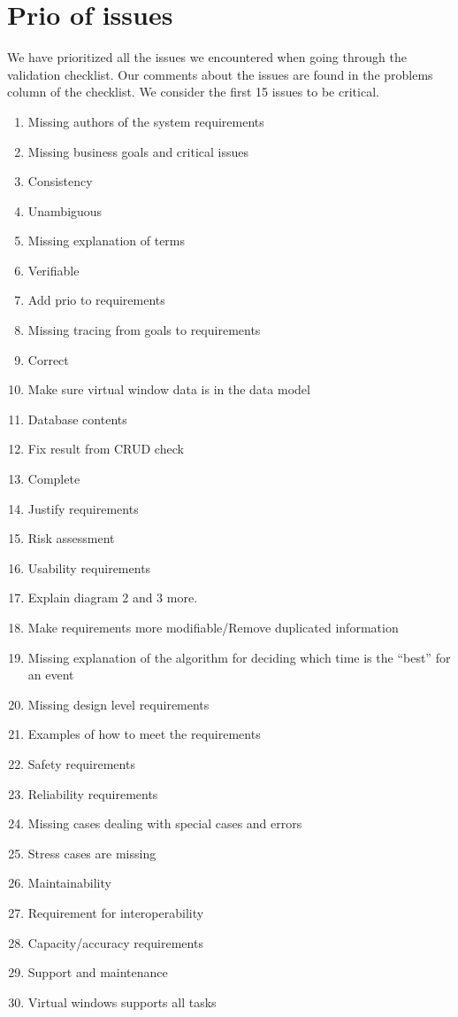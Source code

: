\documentclass[a4paper]{article}
\begin{document}
	\section{Prio of issues}
		We have prioritized all the issues we encountered when going through the validation checklist. Our comments about the issues are found in the problems column of the checklist. We consider the first 15 issues to be critical.
		
		\begin{enumerate}
			\setlength{\itemsep}{1pt}
  \setlength{\parskip}{0pt}
  \setlength{\parsep}{0pt}
			\item Missing authors of the system requirements
			\item Missing business goals and critical issues
			\item Consistency
			\item Unambiguous
			\item Missing explanation of terms
			\item Verifiable
			\item Add prio to requirements
			\item Missing tracing from goals to requirements
			\item Correct
			\item Make sure virtual window data is in the data model
			\item Database contents
			\item Fix result from CRUD check
			\item Complete
			\item Justify requirements
			\item Risk assessment

			\item Usability requirements
			\item Explain diagram 2 and 3 more.
			\item Make requirements more modifiable/Remove duplicated information
			\item Missing explanation of the algorithm for deciding which time is the “best” for an event
			\item Missing design level requirements
			\item Examples of how to meet the requirements
			\item Safety requirements
			\item Reliability requirements
			\item Missing cases dealing with special cases and errors
			\item Stress cases are missing
			\item Maintainability
			\item Requirement for interoperability
			\item Capacity/accuracy requirements
			\item Support and maintenance
			\item Virtual windows supports all tasks


\end{enumerate}
\end{document}
